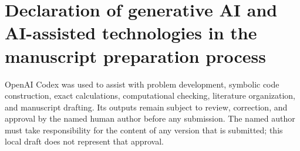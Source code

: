 \documentclass[11pt]{article}
\begin{document}
\section*{Declaration of generative AI and AI-assisted technologies in the
manuscript preparation process}

OpenAI Codex was used to assist with problem development, symbolic code
construction, exact calculations, computational checking, literature
organization, and manuscript drafting.  Its outputs remain subject to review,
correction, and approval by the named human author before any submission.  The
named author must take responsibility for the content of any version that is
submitted; this local draft does not represent that approval.



\end{document}
